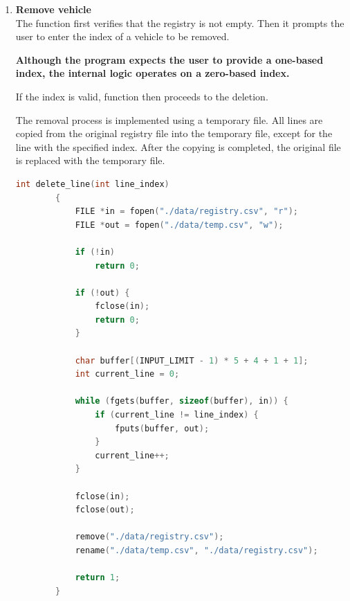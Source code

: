 \documentclass[12pt, a4paper]{article}
\begin{document}
\begin{enumerate}
\begin{lstlisting}[language=C, caption={Writing to the registry}]
        fprintf(file, "%s,%s,%s,%s,%d\n", trim(v.type), trim(v.brand), ...);
        fclose(file);
        return 1;
    }
    \end{lstlisting}

  Eeach value is trimmed to remove leading and trailing whitespace before being stored to the registry. The above example shortens the \texttt{fprintf()} statement for readability.

  \item \textbf{Remove vehicle} \\

  The function first verifies that the registry is not empty. Then it prompts the user to enter the index of a vehicle to be removed.

  \textbf{Although the program expects the user to provide a one-based index, the internal logic operates on a zero-based index.}

   If the index is valid, function then proceeds to the deletion.

   The removal process is implemented using a temporary file. All lines are copied from the original registry file into the temporary file, except for the line with the specified index. After the copying is completed, the original file is replaced with the temporary file.

        \begin{lstlisting}[language=C, caption={Deleting a line in the registry}]
        int delete_line(int line_index)
        {
            FILE *in = fopen("./data/registry.csv", "r");
            FILE *out = fopen("./data/temp.csv", "w");
        
            if (!in)
                return 0;
        
            if (!out) {
                fclose(in);
                return 0;
            }
        
            char buffer[(INPUT_LIMIT - 1) * 5 + 4 + 1 + 1];
            int current_line = 0;
        
            while (fgets(buffer, sizeof(buffer), in)) {
                if (current_line != line_index) {
                    fputs(buffer, out);
                }
                current_line++;
            }
        
            fclose(in);
            fclose(out);
        
            remove("./data/registry.csv");
            rename("./data/temp.csv", "./data/registry.csv");
        
            return 1;
        }
    \end{lstlisting}


\end{enumerate}
\end{document}
